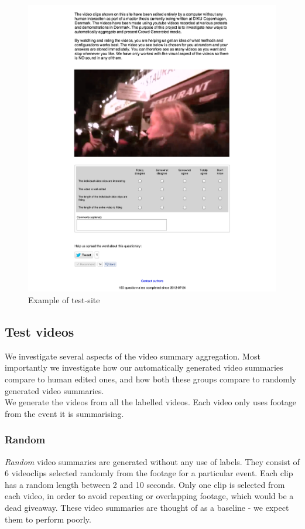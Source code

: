 \begin{figure}
     \centering
     \includegraphics[width=1.0\textwidth]{img/website.png}
     \caption{Example of test-site}\label{fig:website}
\end{figure}
%
\subsection{Test videos}
%
We investigate several aspects of the video summary aggregation. Most importantly we investigate how our automatically generated video summaries compare to human edited ones, and how both these groups compare to randomly generated video summaries.\\
We generate the videos from all the labelled videos. Each video only uses footage from the event it is summarising.
%
\subsubsection{Random}
%
\textit{Random} video summaries are generated without any use of labels. They consist of 6 videoclips selected randomly from the footage for a particular event. Each clip has a random length between 2 and 10 seconds. Only one clip is selected from each video, in order to avoid repeating or overlapping footage, which would be a dead giveaway. These video summaries are thought of as a baseline - we expect them to perform poorly.
%
